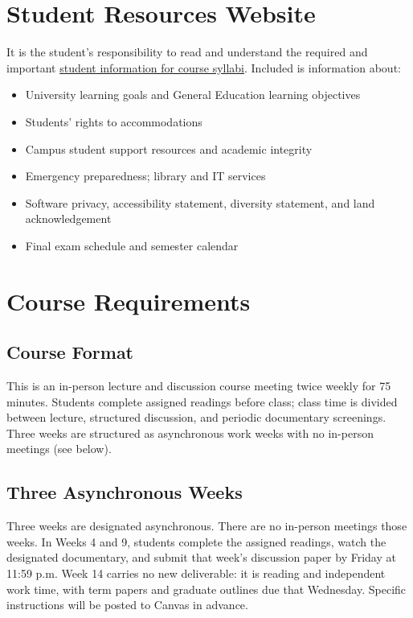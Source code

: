 \documentclass[12pt]{article}
\begin{document}
\section*{Student Resources Website}
It is the student's responsibility to read and understand the required and important \href{https://fdc.fullerton.edu/teaching/student-info-syllabi.html}{student information for course syllabi}. Included is information about:

\begin{itemize}
\item University learning goals and General Education learning objectives
\item Students' rights to accommodations
\item Campus student support resources and academic integrity
\item Emergency preparedness; library and IT services
\item Software privacy, accessibility statement, diversity statement, and land acknowledgement
\item Final exam schedule and semester calendar
\end{itemize}

\section*{Course Requirements}

\subsection*{Course Format}
This is an in-person lecture and discussion course meeting twice weekly for 75 minutes. Students complete assigned readings before class; class time is divided between lecture, structured discussion, and periodic documentary screenings. Three weeks are structured as asynchronous work weeks with no in-person meetings (see below).

\subsection*{Three Asynchronous Weeks}
Three weeks are designated asynchronous. There are no in-person meetings those weeks. In Weeks 4 and 9, students complete the assigned readings, watch the designated documentary, and submit that week's discussion paper by Friday at 11:59 p.m. Week 14 carries no new deliverable: it is reading and independent work time, with term papers and graduate outlines due that Wednesday. Specific instructions will be posted to Canvas in advance.
\end{document}
